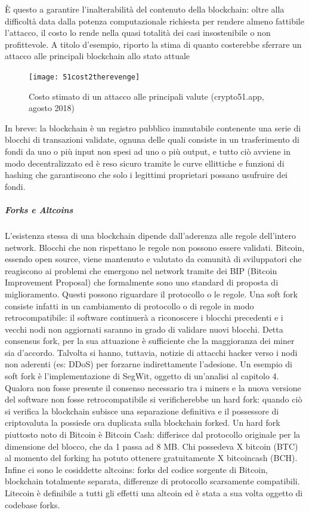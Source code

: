 È questo a garantire l’inalterabilità del contenuto della blockchain: oltre alla difficoltà data dalla potenza computazionale richiesta per rendere almeno fattibile l’attacco, il costo lo rende nella quasi totalità dei casi insostenibile o non profittevole.
A titolo d’esempio, riporto la stima di quanto costerebbe sferrare un attacco alle principali blockchain allo stato attuale

\begin{figure}[h]
\centering
\texttt{[image: 51cost2therevenge]}	
\caption{Costo stimato di un attacco alle principali valute (crypto51.app, agosto 2018)}
\label{fig:51cost2therevenge}
\end{figure}



In breve: la blockchain è un registro pubblico immutabile contenente una serie di blocchi di transazioni validate, ognuna delle quali consiste in un trasferimento di fondi da uno o più input non spesi ad uno o più output, e tutto ciò avviene in modo decentralizzato ed è reso sicuro tramite le curve ellittiche e funzioni di hashing che garantiscono che solo i legittimi proprietari possano usufruire dei fondi.



\subparagraph{Forks e Altcoins}

L’esistenza stessa di una blockchain dipende dall’aderenza alle regole dell’intero network. Blocchi che non rispettano le regole non possono essere validati.
Bitcoin, essendo open source, viene mantenuto e valutato da comunità di sviluppatori che reagiscono ai problemi che emergono nel network tramite dei BIP (Bitcoin Improvement Proposal) che formalmente sono uno standard di proposta di miglioramento. Questi possono riguardare il protocollo o le regole. Una soft fork consiste infatti in un cambiamento di protocollo o di regole in modo retrocompatibile: il software continuerà a riconoscere i blocchi precedenti e i vecchi nodi non aggiornati saranno in grado di validare nuovi blocchi. Detta consensus fork, per la sua attuazione è sufficiente che la maggioranza dei miner sia d’accordo. Talvolta si hanno, tuttavia, notizie di attacchi hacker verso i nodi non aderenti (es: DDoS) per forzarne indirettamente l’adesione. Un esempio di soft fork è l’implementazione di SegWit, oggetto di un’analisi al capitolo 4.
Qualora non fosse presente il consenso necessario tra i miners e la nuova versione del software non fosse retrocompatibile si verificherebbe un hard fork: quando ciò si verifica la blockchain subisce una separazione definitiva e il possessore di criptovaluta la possiede ora duplicata sulla blockchain forked.
Un hard fork piuttosto noto di Bitcoin è Bitcoin Cash: differisce dal protocollo originale per la dimensione del blocco, che da 1 passa ad 8 MB. Chi possedeva X bitcoin (BTC) al momento del forking ha potuto ottenere gratuitamente X bitcoincash (BCH).
Infine ci sono le cosiddette altcoins: forks del codice sorgente di Bitcoin, blockchain totalmente separata, differenze di protocollo scarsamente compatibili. Litecoin è definibile a tutti gli effetti una altcoin ed è stata a sua volta oggetto di codebase forks.


